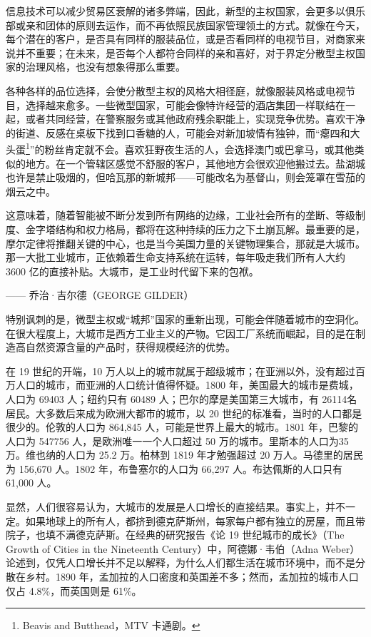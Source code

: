 信息技术可以减少贸易区衰解的诸多弊端，因此，新型的主权国家，会更多以俱乐部或亲和团体的原则去运作，而不再依照民族国家管理领土的方式。就像在今天，每个潜在的客户，是否具有同样的服装品位，或是否看同样的电视节目，对商家来说并不重要；在未来，是否每个人都符合同样的亲和喜好，对于界定分散型主权国家的治理风格，也没有想象得那么重要。

各种各样的品位选择，会使分散型主权的风格大相径庭，就像服装风格或电视节目，选择越来愈多。一些微型国家，可能会像特许经营的酒店集团一样联结在一起，或者共同经营，在警察服务或其他政府残余职能上，实现竞争优势。喜欢干净的街道、反感在桌板下找到口香糖的人，可能会对新加坡情有独钟，而“瘪四和大头蛋\footnote{Beavis and Butthead，MTV 卡通剧。}”的粉丝肯定就不会。喜欢狂野夜生活的人，会选择澳门或巴拿马，或其他类似的地方。在一个管辖区感觉不舒服的客户，其他地方会很欢迎他搬过去。盐湖城也许是禁止吸烟的，但哈瓦那的新城邦——可能改名为基督山，则会笼罩在雪茄的烟云之中。

\begin{tcolorbox}
\kaishu 这意味着，随着智能被不断分发到所有网络的边缘，工业社会所有的垄断、等级制度、金字塔结构和权力格局，都将在这种持续的压力之下土崩瓦解。最重要的是，摩尔定律将推翻关键的中心，也是当今美国力量的关键物理集合，那就是大城市。那一大批工业城市，正依赖着生命支持系统在运转，每年吸走我们所有人大约 3600 亿的直接补贴。大城市，是工业时代留下来的包袱。
\begin{flushright}
—— 乔治·吉尔德（GEORGE GILDER）  
\end{flushright}
\end{tcolorbox}

特别讽刺的是，微型主权或“城邦”国家的重新出现，可能会伴随着城市的空洞化。在很大程度上，大城市是西方工业主义的产物。它因工厂系统而崛起，目的是在制造高自然资源含量的产品时，获得规模经济的优势。

在 19 世纪的开端，10 万人以上的城市就属于超级城市；在亚洲以外，没有超过百万人口的城市，而亚洲的人口统计值得怀疑。1800 年，美国最大的城市是费城，人口为 69403 人；纽约只有 60489 人；巴尔的摩是美国第三大城市，有 26114名居民。大多数后来成为欧洲大都市的城市，以 20 世纪的标准看，当时的人口都是很少的。伦敦的人口为 864,845 人，可能是世界上最大的城市。1801 年，巴黎的人口为 547756 人，是欧洲唯一一个人口超过 50 万的城市。里斯本的人口为35 万。维也纳的人口为 25.2 万。柏林到 1819 年才勉强超过 20 万人。马德里的居民为 156,670 人。1802 年，布鲁塞尔的人口为 66,297 人。布达佩斯的人口只有 61,000 人。

显然，人们很容易认为，大城市的发展是人口增长的直接结果。事实上，并不一定。如果地球上的所有人，都挤到德克萨斯州，每家每户都有独立的房屋，而且带院子，也填不满德克萨斯。在经典的研究报告《论 19 世纪城市的成长》（The Growth of Cities in the Nineteenth Century）中，阿德娜·韦伯（Adna Weber）论述到，仅凭人口增长并不足以解释，为什么人们都生活在城市环境中，而不是分散在乡村。1890 年，孟加拉的人口密度和英国差不多；然而，孟加拉的城市人口仅占 4.8\%，而英国则是 61\%。

